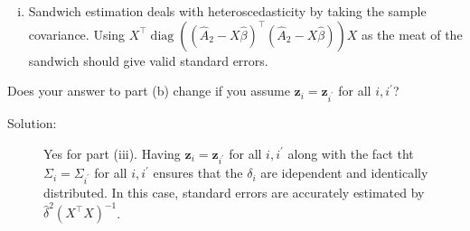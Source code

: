 \documentclass[11pt, letterpaper]{article}
\newcommand{\bz}{{\bm z}}
\begin{document}
\begin{enumerate}[(a)]
\begin{description}
\begin{enumerate}[i.]
    In the second state, we regress on $\hat{\alpha}_{1i}$. While each response
    observation is independent, the errors are not identically distributed, so
    in general, our standard errors would not be valid.
  \item Sandwich estimation deals with heteroscedasticity by taking the sample
    covariance. Using $X^\intercal\operatorname{diag}\left(
      \left(\hat{A}_2 - X\hat{\beta}\right)^\intercal
      \left(\hat{A}_2 - X\hat{\beta}\right)
    \right)X$ as the meat of
    the sandwich should give valid standard errors.
  \end{enumerate}
\end{description}

{\em \item Does your answer to part (b) change if you assume $\bz_i = \bz_{i^\prime}$ for all $i,i^\prime$?}

\begin{description}
\item[Solution:] Yes for part (iii). Having $\bz_i = \bz_{i^\prime}$ for all
  $i,i^\prime$ along with the fact tht $\Sigma_i = \Sigma_{i^\prime}$ for all
  $i,i^\prime$ ensures that the $\delta_i$ are idependent and identically
  distributed. In this case, standard errors are accurately estimated by
  $\hat{\delta}^2\left(X^\intercal X\right)^{-1}$.
\end{description}

\end{enumerate}
\end{document}
